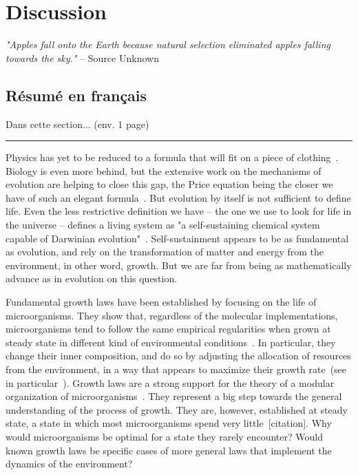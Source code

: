 \chapter{Discussion}

\textit{"Apples fall onto the Earth because natural selection eliminated apples falling towards the sky."} -- Source Unknown

\section*{Résumé en français}

Dans cette section... (env. 1 page)

\begin{center}
\noindent\rule{4cm}{0.1pt}
\end{center}

Physics has yet to be reduced to a formula that will fit on a piece of clothing~\cite{falk_universe_2005}.
Biology is even more behind, but the extensive work on the mechanisms of evolution are helping to close this gap, the Price equation being the closer we have of such an elegant formula~\cite{frank_natural_2012}.
But evolution by itself is not sufficient to define life.
Even the less restrictive definition we have -- the one we use to look for life in the universe -- defines a living system as "a self-sustaining chemical system capable of Darwinian evolution"~\cite{deamer_origins_1994,benner_defining_2010}.
Self-sustainment appears to be as fundamental as evolution, and rely on the transformation of matter and energy from the environment, in other word, growth.
But we are far from being as mathematically advance as in evolution on this question.

Fundamental growth laws have been established by focusing on the life of microorganisms.
They show that, regardless of the molecular implementations, microorganisms tend to follow the same empirical regularities when grown at steady state in different kind of environmental conditions~\cite{molenaar_shifts_2009,scott_emergence_2014,scott_interdependence_2010,scott_bacterial_2011}.
In particular, they change their inner composition, and do so by adjusting the allocation of resources from the environment, in a way that appears to maximize their growth rate~(see in particular~\cite{molenaar_shifts_2009,scott_emergence_2014}).
Growth laws are a strong support for the theory of a modular organization of microorganisms~\cite{scott_emergence_2014,hartwell_molecular_1999,arkin_fast_2006,guido_bottom-up_2006}.
They represent a big step towards the general understanding of the process of growth.
They are, however, established at steady state, a state in which most microorganisms spend very little~[citation].
Why would microorganisms be optimal for a state they rarely encounter?
Would known growth laws be specific cases of more general laws that implement the dynamics of the environment?

